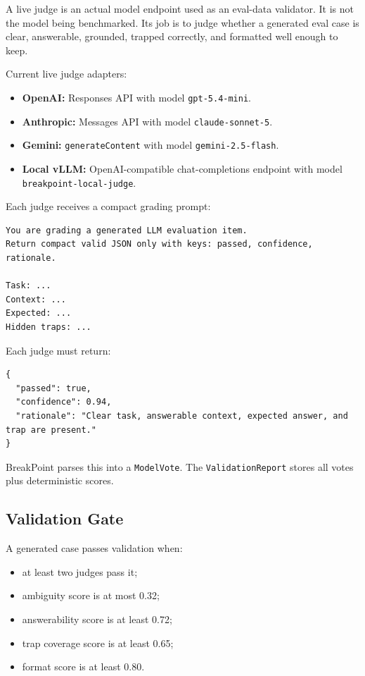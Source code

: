 \documentclass[11pt]{article}
\newcommand{\code}[1]{\texttt{#1}}
\begin{document}
A live judge is an actual model endpoint used as an eval-data validator. It is not the model being benchmarked. Its job is to judge whether a generated eval case is clear, answerable, grounded, trapped correctly, and formatted well enough to keep.

Current live judge adapters:

\begin{itemize}
  \item \textbf{OpenAI:} Responses API with model \code{gpt-5.4-mini}.
  \item \textbf{Anthropic:} Messages API with model \code{claude-sonnet-5}.
  \item \textbf{Gemini:} \code{generateContent} with model \code{gemini-2.5-flash}.
  \item \textbf{Local vLLM:} OpenAI-compatible chat-completions endpoint with model \code{breakpoint-local-judge}.
\end{itemize}

Each judge receives a compact grading prompt:

\begin{lstlisting}[caption={Conceptual judge input}]
You are grading a generated LLM evaluation item.
Return compact valid JSON only with keys: passed, confidence, rationale.

Task: ...
Context: ...
Expected: ...
Hidden traps: ...
\end{lstlisting}

Each judge must return:

\begin{lstlisting}[caption={Judge output contract}]
{
  "passed": true,
  "confidence": 0.94,
  "rationale": "Clear task, answerable context, expected answer, and trap are present."
}
\end{lstlisting}

BreakPoint parses this into a \code{ModelVote}. The \code{ValidationReport} stores all votes plus deterministic scores.

\subsection{Validation Gate}

A generated case passes validation when:

\begin{itemize}
  \item at least two judges pass it;
  \item ambiguity score is at most 0.32;
  \item answerability score is at least 0.72;
  \item trap coverage score is at least 0.65;
  \item format score is at least 0.80.
\end{itemize}
\end{document}
